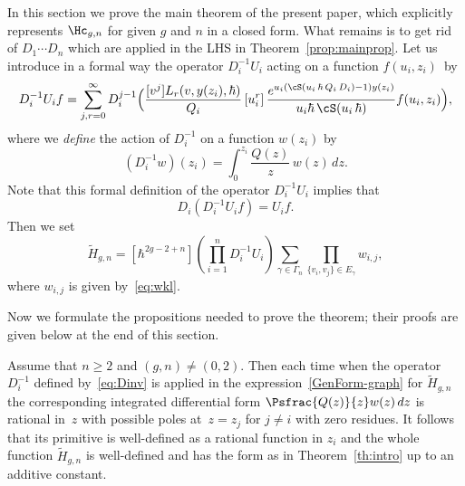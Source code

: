 In this section we prove the main theorem of the present paper, which explicitly represents $\Hc_{g,n}$ for given $g$ and $n$ in a closed form. What remains is to get rid of $D_1\cdots D_n$ which are applied in the LHS in Theorem~\ref{prop:mainprop}.
Let us introduce in a formal way the operator $D_{i}^{-1}U_i$ acting on a function $f(u_i,z_i)$~by\vspace*{-3pt}
\begin{equation}\label{eq:DinvU}
D_i^{-1}U_{i} f=\sum_{j,r=0}^\infty D_i^{j-1}\Bigl(\frac{[v^j]L_r(v,y(z_i),\hbar)}{Q_i}
\,[u_i^r]\, \frac{e^{u_i(\cS(u_i\,\hbar\,Q_i\,D_i)-1)y(z_i)}}{u_i\hbar\,\cS(u_i\,\hbar)}f(u_i,z_i) \Bigr),
\end{equation}
where we \emph{define} the action of $D_i^{-1}$ on a function $w(z_i)$ by\vspace*{-3pt}
\begin{equation}\label{eq:Dinv}
(D_i^{-1}w)(z_i)=\int_0^{z_i}\frac{Q(z)}{z}\,w(z)\,dz.
\end{equation}
Note that this formal definition of the operator $D_{i}^{-1}U_i$ implies that
\begin{equation}\label{eq:DDinv}
D_i\left(D_{i}^{-1}U_i f\right)=U_if.
\end{equation}
Then we set\vspace*{-3pt}
\begin{equation}
\label{GenForm-graph}
\widetilde H_{g,n} = [\hbar^{2g-2+n}] \left(\textstyle\prod_{i=1}^n D_i^{-1}U_i\right) \sum\limits_{\gamma\in\Gamma_n}\prod\limits_{\{v_i,v_j\}\in E_\gamma} w_{i,j},
\end{equation}
where $w_{i,j}$ is given by~\eqref{eq:wkl}.

Now we formulate the propositions needed to prove the theorem; their proofs are given below at the end of this section.

\begin{proposition}\label{prop:tildeH}
Assume that $n\ge2$ and $(g,n)\ne(0,2)$. Then each time when the operator $D_i^{-1}$ defined by~\eqref{eq:Dinv} is applied in the expression~\eqref{GenForm-graph} for $\widetilde H_{g,n}$ the corresponding integrated differential form $\Psfrac{Q(z)}{z}w(z)\,dz$ is rational in~$z$ with possible poles at~$z=z_j$ for $j\ne i$ with zero residues. It follows that its primitive is well-defined as a rational function in $z_i$ and the whole function $\widetilde H_{g,n}$ is well-defined and has the form as in Theorem~\ref{th:intro} up to an additive constant.
\end{proposition}

